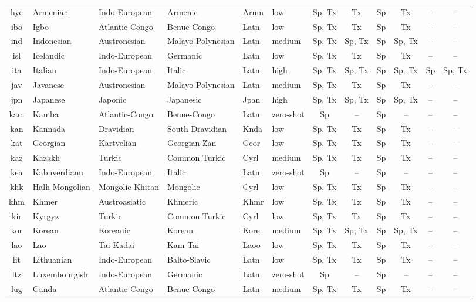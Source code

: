 \begin{table}[!p]
\begin{tabular}{clHHllcccccc}
hye & Armenian & Indo-European & Armenic & Armn & low & Sp, Tx & Tx & Sp & Tx & -- & -- \\
ibo & Igbo & Atlantic-Congo & Benue-Congo & Latn & low & Sp, Tx & Tx & Sp & Tx & -- & -- \\
ind & Indonesian & Austronesian & Malayo-Polynesian & Latn & medium & Sp, Tx & Sp, Tx  & Sp & Sp, Tx & -- & -- \\
isl & Icelandic & Indo-European & Germanic & Latn & low & Sp, Tx & Tx & Sp & Tx & -- & -- \\
ita & Italian & Indo-European & Italic & Latn & high & Sp, Tx & Sp, Tx  & Sp & Sp, Tx & Sp & Sp, Tx \\
jav & Javanese & Austronesian & Malayo-Polynesian & Latn & medium & Sp, Tx & Tx & Sp & Tx & -- & -- \\
jpn & Japanese & Japonic & Japanesic & Jpan & high & Sp, Tx & Sp, Tx  & Sp & Sp, Tx & -- & -- \\
kam & Kamba & Atlantic-Congo & Benue-Congo & Latn & zero-shot & Sp & --  & Sp & -- & -- & -- \\
kan & Kannada & Dravidian & South Dravidian & Knda & low & Sp, Tx & Tx & Sp & Tx & -- & -- \\
kat & Georgian & Kartvelian & Georgian-Zan & Geor & low & Sp, Tx & Tx & Sp & Tx & -- & -- \\
kaz & Kazakh & Turkic & Common Turkic & Cyrl & medium & Sp, Tx & Tx & Sp & Tx & -- & -- \\
kea & Kabuverdianu & Indo-European & Italic & Latn & zero-shot & Sp & --  & Sp & -- & -- & -- \\
khk & Halh Mongolian & Mongolic-Khitan & Mongolic & Cyrl & low & Sp, Tx & Tx & Sp & Tx & -- & -- \\
khm & Khmer & Austroasiatic & Khmeric & Khmr & low & Sp, Tx & Tx & Sp & Tx & -- & -- \\
kir & Kyrgyz & Turkic & Common Turkic & Cyrl & low & Sp, Tx & Tx & Sp & Tx & -- & -- \\
kor & Korean & Koreanic & Korean & Kore & medium & Sp, Tx & Sp, Tx  & Sp & Sp, Tx & -- & -- \\
lao & Lao & Tai-Kadai & Kam-Tai & Laoo & low & Sp, Tx & Tx & Sp & Tx & -- & -- \\
lit & Lithuanian & Indo-European & Balto-Slavic & Latn & low & Sp, Tx & Tx & Sp & Tx & -- & -- \\
ltz & Luxembourgish & Indo-European & Germanic & Latn & zero-shot & Sp & --  & Sp & -- & -- & -- \\
lug & Ganda & Atlantic-Congo & Benue-Congo & Latn & medium & Sp, Tx & Tx & Sp & Tx & -- & -- \\

\end{tabular}
\end{table}
